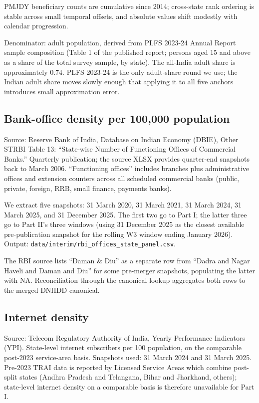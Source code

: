 \documentclass[
]{article}
\begin{document}
PMJDY beneficiary counts are cumulative since 2014; cross-state rank
ordering is stable across small temporal offsets, and absolute values
shift modestly with calendar progression.

Denominator: adult population, derived from PLFS 2023-24 Annual Report
sample composition (Table 1 of the published report; persons aged 15 and
above as a share of the total survey sample, by state). The all-India
adult share is approximately 0.74. PLFS 2023-24 is the only adult-share
round we use; the Indian adult share moves slowly enough that applying
it to all five anchors introduces small approximation error.

\subsection{Bank-office density per 100,000
population}\label{bank-office-density-per-100000-population}

Source: Reserve Bank of India, Database on Indian Economy (DBIE), Other
STRBI Table 13: ``State-wise Number of Functioning Offices of Commercial
Banks.'' Quarterly publication; the source XLSX provides quarter-end
snapshots back to March 2006. ``Functioning offices'' includes branches
plus administrative offices and extension counters across all scheduled
commercial banks (public, private, foreign, RRB, small finance, payments
banks).

We extract five snapshots: 31 March 2020, 31 March 2021, 31 March 2024,
31 March 2025, and 31 December 2025. The first two go to Part I; the
latter three go to Part II's three windows (using 31 December 2025 as
the closest available pre-publication snapshot for the rolling W3 window
ending January 2026). Output:
\texttt{data/interim/rbi\_offices\_state\_panel.csv}.

The RBI source lists ``Daman \& Diu'' as a separate row from ``Dadra and
Nagar Haveli and Daman and Diu'' for some pre-merger snapshots,
populating the latter with NA. Reconciliation through the canonical
lookup aggregates both rows to the merged DNHDD canonical.

\subsection{Internet density}\label{internet-density}

Source: Telecom Regulatory Authority of India, Yearly Performance
Indicators (YPI). State-level internet subscribers per 100 population,
on the comparable post-2023 service-area basis. Snapshots used: 31 March
2024 and 31 March 2025. Pre-2023 TRAI data is reported by Licensed
Service Areas which combine post-split states (Andhra Pradesh and
Telangana, Bihar and Jharkhand, others); state-level internet density on
a comparable basis is therefore unavailable for Part I.
\end{document}
